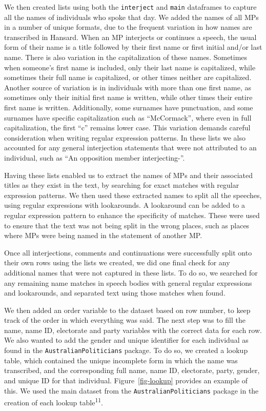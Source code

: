 \documentclass[
  letterpaper,
  DIV=11,
  numbers=noendperiod]{scrartcl}
\begin{document}
We then created lists using both the \texttt{interject} and
\texttt{main} dataframes to capture all the names of individuals who
spoke that day. We added the names of all MPs in a number of unique
formats, due to the frequent variation in how names are transcribed in
Hansard. When an MP interjects or continues a speech, the usual form of
their name is a title followed by their first name or first initial
and/or last name. There is also variation in the capitalization of these
names. Sometimes when someone's first name is included, only their last
name is capitalized, while sometimes their full name is capitalized, or
other times neither are capitalized. Another source of variation is in
individuals with more than one first name, as sometimes only their
initial first name is written, while other times their entire first name
is written. Additionally, some surnames have punctuation, and some
surnames have specific capitalization such as ``McCormack'', where even
in full capitalization, the first ``c'' remains lower case. This
variation demands careful consideration when writing regular expression
patterns. In these lists we also accounted for any general interjection
statements that were not attributed to an individual, such as ``An
opposition member interjecting-''.

Having these lists enabled us to extract the names of MPs and their
associated titles as they exist in the text, by searching for exact
matches with regular expression patterns. We then used these extracted
names to split all the speeches, using regular expressions with
lookarounds. A lookaround can be added to a regular expression pattern
to enhance the specificity of matches. These were used to ensure that
the text was not being split in the wrong places, such as places where
MPs were being named in the statement of another MP.

Once all interjections, comments and continuations were successfully
split onto their own rows using the lists we created, we did one final
check for any additional names that were not captured in these lists. To
do so, we searched for any remaining name matches in speech bodies with
general regular expressions and lookarounds, and separated text using
those matches when found.

We then added an order variable to the dataset based on row number, to
keep track of the order in which everything was said. The next step was
to fill the name, name ID, electorate and party variables with the
correct data for each row. We also wanted to add the gender and unique
identifier for each individual as found in the
\texttt{AustralianPoliticians} package. To do so, we created a lookup
table, which contained the unique incomplete form in which the name was
transcribed, and the corresponding full name, name ID, electorate,
party, gender, and unique ID for that individual.
Figure~\ref{fig-lookup} provides an example of this. We used the main
dataset from the \texttt{AustralianPoliticians} package in the creation
of each lookup table\textsuperscript{11}.
\end{document}
